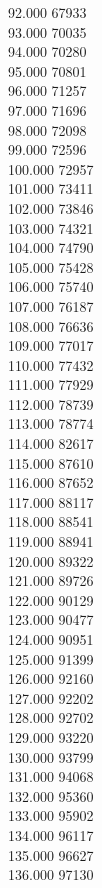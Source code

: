 { 92.000	67933 \\
 93.000	70035 \\
 94.000	70280 \\
 95.000	70801 \\
 96.000	71257 \\
 97.000	71696 \\
 98.000	72098 \\
 99.000	72596 \\
 100.000	72957 \\
 101.000	73411 \\
 102.000	73846 \\
 103.000	74321 \\
 104.000	74790 \\
 105.000	75428 \\
 106.000	75740 \\
 107.000	76187 \\
 108.000	76636 \\
 109.000	77017 \\
 110.000	77432 \\
 111.000	77929 \\
 112.000	78739 \\
 113.000	78774 \\
 114.000	82617 \\
 115.000	87610 \\
 116.000	87652 \\
 117.000	88117 \\
 118.000	88541 \\
 119.000	88941 \\
 120.000	89322 \\
 121.000	89726 \\
 122.000	90129 \\
 123.000	90477 \\
 124.000	90951 \\
 125.000	91399 \\
 126.000	92160 \\
 127.000	92202 \\
 128.000	92702 \\
 129.000	93220 \\
 130.000	93799 \\
 131.000	94068 \\
 132.000	95360 \\
 133.000	95902 \\
 134.000	96117 \\
 135.000	96627 \\
 136.000	97130 \\
}

